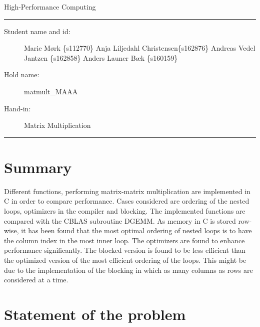 \begin{center}
{{\Large \sc High-Performance Computing}}
\end{center}
\rule{\textwidth}{1pt}
\begin{description}
\item[Student name and id:] Marie Mørk \{s112770\} Anja Liljedahl Christensen\{s162876\}
 Andreas Vedel Jantzen \{s162858\}
 Anders Launer Bæk \{s160159\}
\item[Hold name:] matmult\_MAAA
\item[Hand-in:] Matrix Multiplication
\end{description}
\rule{\textwidth}{1pt}


\section{Summary}
Different functions, performing matrix-matrix multiplication are implemented in C in order to compare performance. Cases considered are ordering of the nested loops, optimizers in the compiler and blocking. The implemented functions are compared with the CBLAS subroutine DGEMM. As memory in C is stored row-wise, it has been found that the most optimal ordering of nested loops is to have the column index in the most inner loop. The optimizers are found to enhance performance significantly. The blocked version is found to be less efficient than the optimized version of the most efficient ordering of the loops. This might be due to the implementation of the blocking in which as many columns as rows are considered at a time. 

\section{Statement of the problem}

